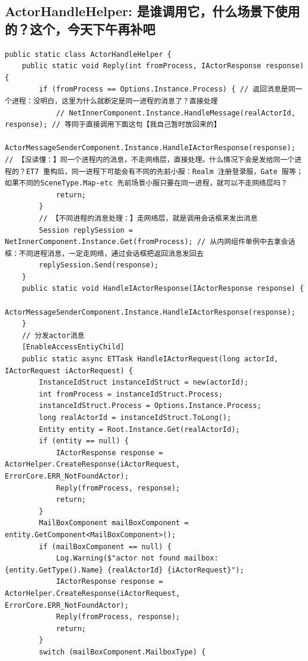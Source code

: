 \documentclass[9pt, b5paper]{article}
\begin{document}
\subsection{ActorHandleHelper: 是谁调用它，什么场景下使用的？这个，今天下午再补吧}
\label{sec-3-19}
\begin{verbatim}
public static class ActorHandleHelper {
    public static void Reply(int fromProcess, IActorResponse response) {
        if (fromProcess == Options.Instance.Process) { // 返回消息是同一个进程：没明白，这里为什么就断定是同一进程的消息了？直接处理
            // NetInnerComponent.Instance.HandleMessage(realActorId, response); // 等同于直接调用下面这句【我自己暂时放回来的】
            ActorMessageSenderComponent.Instance.HandleIActorResponse(response); // 【没读懂：】同一个进程内的消息，不走网络层，直接处理。什么情况下会是发给同一个进程的？ET7 重构后，同一进程下可能会有不同的先前小服：Realm 注册登录服，Gate 服等；如果不同的SceneType.Map-etc 先前场景小服只要在同一进程，就可以不走网络层吗？
            return;
        }
        // 【不同进程的消息处理：】走网络层，就是调用会话框来发出消息
        Session replySession = NetInnerComponent.Instance.Get(fromProcess); // 从内网组件单例中去拿会话框：不同进程消息，一定走网络，通过会话框把返回消息发回去
        replySession.Send(response);
    }
    public static void HandleIActorResponse(IActorResponse response) {
        ActorMessageSenderComponent.Instance.HandleIActorResponse(response);
    }
    // 分发actor消息
    [EnableAccessEntiyChild]
    public static async ETTask HandleIActorRequest(long actorId, IActorRequest iActorRequest) {
        InstanceIdStruct instanceIdStruct = new(actorId);
        int fromProcess = instanceIdStruct.Process;
        instanceIdStruct.Process = Options.Instance.Process;
        long realActorId = instanceIdStruct.ToLong();
        Entity entity = Root.Instance.Get(realActorId);
        if (entity == null) {
            IActorResponse response = ActorHelper.CreateResponse(iActorRequest, ErrorCore.ERR_NotFoundActor);
            Reply(fromProcess, response);
            return;
        }
        MailBoxComponent mailBoxComponent = entity.GetComponent<MailBoxComponent>();
        if (mailBoxComponent == null) {
            Log.Warning($"actor not found mailbox: {entity.GetType().Name} {realActorId} {iActorRequest}");
            IActorResponse response = ActorHelper.CreateResponse(iActorRequest, ErrorCore.ERR_NotFoundActor);
            Reply(fromProcess, response);
            return;
        }
        switch (mailBoxComponent.MailboxType) {

\end{verbatim}
\end{document}
